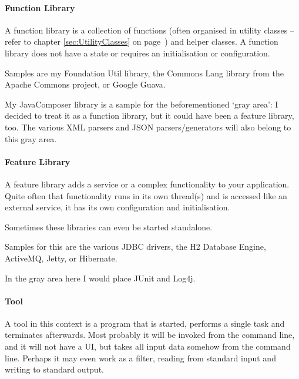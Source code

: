 \documentclass[11pt,a4paper, titlepage, parskip=half, headsepline, footsepline, cleardoublepage=current, headheight=1cm]{scrbook}
\newcommand*{\tqvref}[1]{\hyperref[{#1}]{\ref*{#1}} on page~\pageref{#1}}
\begin{document}
\paragraph{Function Library}\label{sec:FunctionLibrary}
A function library is a collection of functions (often organised in utility classes – refer to chapter \tqvref{sec:UtilityClasses}) and helper classes. A function library does not have a state or requires an initialisation or configuration.

Samples are my Foundation Util library\autocite{TQUADRAT_ORG_FOUNDATION_UTIL}, the Commons Lang library from the Apache Commons project\autocite{APACHE_COMMONS_LANG}, or Google Guava\autocite{GOOGLE_GUAVA}.

My JavaComposer library\autocite{TQUADRAT_ORG_FOUNDATION_JAVACOMPOSER} is a sample for the beforementioned ‘gray area’: I decided to treat it as a function library, but it could have been a feature library, too. The various XML parsers and JSON parsers/generators will also belong to this gray area. 

\paragraph{Feature Library}\label{sec:FeatureLibrary}
A feature library adds a service or a complex functionality to your application. Quite often that functionality runs in its own thread(s) and is accessed like an external service, it has its own configuration and initialisation.

Sometimes these libraries can even be started standalone.

Samples for this are the various JDBC drivers, the H2 Database Engine\autocite{H2_DATABASE}, ActiveMQ\autocite{APACHE_ACTIVEMQ}, Jetty\autocite{ECLIPSE_JETTY}, or Hibernate\autocite{HIBERNATE_ORM}.

In the gray area here I would place JUnit\autocite{JUNIT5} and Log4j\autocite{APACHE_LOG4J}.

\paragraph{Tool}\label{sec:Tool}
A tool in this context is a program that is started, performs a single task and terminates afterwards. Most probably it will be invoked from the command line, and it will not have a UI, but takes all input data somehow from the command line. Perhaps it may even work as a filter\autocite{WIKIPEDIA:Filter}, reading from standard input and writing to standard output.
\end{document}
